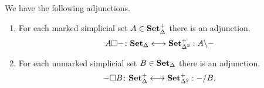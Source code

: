 \documentclass[main.tex]{subfiles}
\begin{document}
\begin{proposition}
  We have the following adjunctions.
  \begin{enumerate}
    \item For each marked simplicial set $A \in \mathbf{Set}_{\Delta}^{+}$ there is an adjunction.
      \begin{equation*}
        A \square -\colon \mathbf{Set}_{\Delta} \longleftrightarrow \mathbf{Set}_{\Delta^{2}}^{+} : A \backslash -
      \end{equation*}

    \item For each unmarked simplicial set $B \in \mathbf{Set}_{\Delta}$ there is an adjunction.
      \begin{equation*}
        - \square B\colon \mathbf{Set}_{\Delta}^{+} \longleftrightarrow \mathbf{Set}_{\Delta^{2}}^{+} : - / B.
      \end{equation*}
  \end{enumerate}
\end{proposition}
\end{document}
